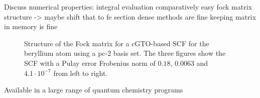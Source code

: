 Discuss numerical properties:
integral evaluation comparatively easy
fock matrix structure -> maybe shift that to fe section
dense methods are fine
keeping matrix in memory is fine

\begin{landscape}
\begin{figure}
	\centering
	\caption{Structure of the Fock matrix for a cGTO-based SCF
		for the beryllium atom
		using a pc-2 basis set.
		The three figures show the SCF with a Pulay error
		Frobenius norm of $0.18$, $0.0063$ and $4.1 \cdot 10^{-7}$
		from left to right.}
	\label{fig:StructureGaussianFock}
\end{figure}
\end{landscape}



%
%



Available in a large range of quantum chemistry programs
\cite{Ahlrichs1989,ORCA,Hutter2014,Sun2017,Verstraelen2017,PyQuante}


